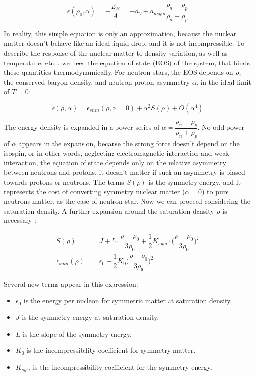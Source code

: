 \begin{equation}
\epsilon (\rho_{0}, \alpha) = -\frac{E_{B}}{A} = -a_{V} + a_{asym} \dfrac{\rho_{n} - \rho_{p}}{\rho_{n} + \rho_{p}}
\end{equation}

In reality, this simple equation is only an approximation, because the nuclear matter doesn't behave like an ideal liquid drop, and it is not incompressible. To describe the response of the nuclear matter to density variation, as well as temperature, etc... we need the equation of state (EOS) of the system, that binds these quantities thermodynamically. For neutron stars, the EOS depends on $\rho$, the conserved baryon density, and neutron-proton asymmetry $\alpha$, in the ideal limit of $T = 0$:

\begin{equation}
\epsilon (\rho,\alpha) = \epsilon_{snm} (\rho, \alpha = 0) + \alpha ^{2} S(\rho) + O(\alpha ^{4})
\end{equation}

The energy density is expanded in a power series of $\alpha = \dfrac{\rho_{n} - \rho_{p}}{\rho_{n} + \rho_{p}}$. No odd power of $\alpha$ appears in the expansion, because the strong force doesn't depend on the isospin, or in other words, neglecting electromagnetic interaction and weak interaction, the equation of state depends only on the relative asymmetry between neutrons and protons, it doesn't matter if such an asymmetry is biased towards protons or neutrons.
The terms $S(\rho)$ is the symmetry energy, and it represents the cost of converting symmetry nuclear matter ($\alpha = 0$) to pure neutrons matter, as the case of neutron star. Now we can proceed considering the saturation density. A further expansion around the saturation density $\rho$ is necessary \cite{Piekarewicz_2009}:
	
\begin{equation}
\begin{split}
S(\rho) &= J + L \cdot \dfrac{\rho - \rho_{0}}{3 \rho_{0}} + \dfrac{1}{2} K_{sym} \cdot \biggl(\dfrac{\rho - \rho_{0}}{3 \rho_{0}}\biggl)^{2} \\
\epsilon _{smn} (\rho) &= \epsilon_{0} + \dfrac{1}{2}K_{0} \biggl(\dfrac{\rho - \rho_{0}}{3 \rho_{0}} \biggl)^{2} 
\end{split}
\end{equation}

Several new terms appear in this expression:
\begin{itemize}
\item $\epsilon_{0}$ is the energy per nucleon for symmetric matter at saturation density.
\item $J$ is the symmetry energy at saturation density.
\item $L$ is the slope of the symmetry energy.
\item $K_{0}$ is the incompressibility coefficient for symmetry matter. 
\item $K_{sym}$ is the incompressibility coefficient for the symmetry energy.
\end{itemize}

